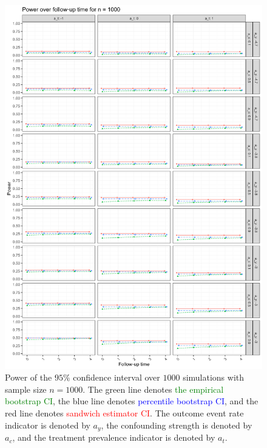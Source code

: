 \documentclass[pdflatex,sn-vancouver-ay]{sn-jnl}%
\theoremstyle{thmstyleone}%
\theoremstyle{thmstyletwo}%
\theoremstyle{thmstylethree}%
\begin{document}
\begin{appendices}
\begin{figure}[H]
\centering
\includegraphics[height=0.95\textheight]{plots/plots_power1000.png}
\caption{Power of the $95\%$ confidence interval over $1000$ simulations with sample size $n = 1000$. The green line denotes \textcolor{green}{the empirical bootstrap CI}, the blue line denotes \textcolor{blue}{percentile bootstrap CI}, and the red line denotes \textcolor{red}{sandwich estimator CI}. The outcome event rate indicator is denoted by $a_y$, the confounding strength is denoted by $a_c$, and the treatment prevalence indicator is denoted by $a_t$.}
\label{plt:power1000}
\end{figure}

\newpage


\end{appendices}
\end{document}
